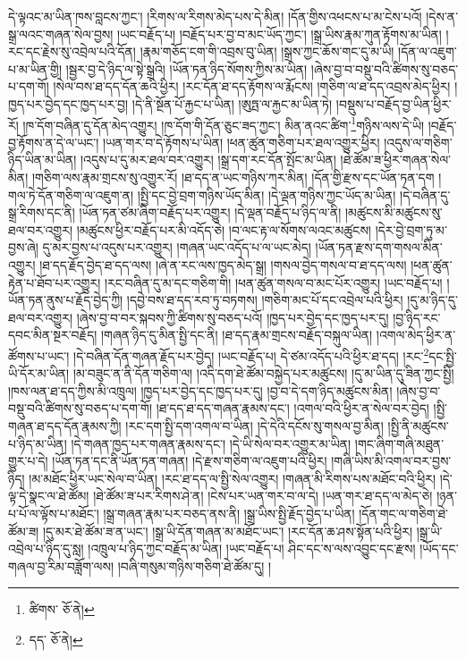 དེ་ལྟའང་མ་ཡིན་ཁས་བླངས་ཀྱང་། །རིགས་ལ་རིགས་མེད་པས་དེ་མིན། །དོན་གྱིས་འཕངས་པ་མ་ངེས་པའོ། །དེས་ན་སྒྲ་ལའང་གཞན་སེལ་བྱས། །ཡང་བརྗོད་པ། །བརྗོད་པར་བྱ་བ་མང་ཡོད་ཀྱང་། །སྒྲ་ཡིས་རྣམ་ཀུན་རྟོགས་མ་ཡིན། །རང་དང་རྗེས་སུ་འབྲེལ་པའི་དོན། །རྣམ་གཅོད་ངག་གི་འབྲས་བུ་ཡིན། །སྒྲས་ཀྱང་ཆོས་གང་དུ་མ་ཡི། །དོན་ལ་འཇུག་པ་མ་ཡིན་གྱི། །སྦྱར་བྱ་དེ་ཉིད་ལ་སྟེ་སྒྲའི། །ཡོན་ཏན་ཉིད་སོགས་ཀྱིས་མ་ཡིན། །ཞེས་བྱ་བ་བསྡུ་བའི་ཚིགས་སུ་བཅད་པ་དག་གོ། །སེལ་བས་ཐ་དད་དོན་ཆའི་ཕྱིར། །རང་དོན་ཐ་དད་རྟོགས་ལ་རྨོངས། །གཅིག་ལ་ཐ་དད་འབྲས་མེད་ཕྱིར། །ཁྱད་པར་བྱེད་དང་ཁྱད་པར་བྱ། །དེ་ནི་སྔོན་པོ་རྐྱང་པ་ཡིན། །ཨུཏྤ་ལ་རྐྱང་མ་ཡིན་ཏེ། །བསྡུས་པ་བརྗོད་བྱ་ཡིན་ཕྱིར་རོ། །ཁ་དོག་བཞིན་དུ་དོན་མེད་འགྱུར། །ཁ་དོག་གི་དོན་ཅུང་ཟད་ཀྱང་། མིན་ནའང་ཚིག་\footnote{ཚིགས་  ཅོ་ནེ། }གཉིས་ལས་དེ་ཡི། །བརྗོད་བྱ་རྟོགས་ན་དེ་ལ་ཡང་། །ཡན་གར་བ་དེ་རྟོགས་པ་ཡིན། །ཕན་ཚུན་གཅིག་པར་ཐལ་འགྱུར་ཕྱིར། །འདུས་ལ་གཅིག་ཉིད་ཡིན་མ་ཡིན། །འདུས་པ་དུ་མར་ཐལ་བར་འགྱུར། །སྒྲ་དག་རང་དོན་སྤོང་མ་ཡིན། །ཐེ་ཚོམ་ཟ་ཕྱིར་གཞན་སེལ་མིན། །གཅིག་ལས་རྣམ་གྲངས་སུ་འགྱུར་རོ། །ཐ་དད་ན་ཡང་གཉིས་ཀར་མིན། །དོན་གྱི་རྫས་དང་ཡོན་ཏན་དག །གལ་ཏེ་དོན་གཅིག་ལ་འཇུག་ན། །སྤྱི་དང་བྱེ་བྲག་གཉིས་ཡོད་མིན། །དེ་ལྡན་གཉིས་ཀྱང་ཡོད་མ་ཡིན། །དེ་བཞིན་དུ་སྒྲ་རིགས་དང་ནི། །ཡོན་ཏན་ཙམ་ཞིག་བརྗོད་པར་འགྱུར། །དེ་ལྡན་བརྗོད་པ་ཉིད་ལ་ནི། །མཚུངས་མི་མཚུངས་སུ་ཐལ་བར་འགྱུར། །མཚུངས་ཕྱིར་བརྗོད་པར་མི་འདོད་ཅེ། །བ་ལང་རྟ་ལ་སོགས་ལའང་མཚུངས། །དེར་བྱེ་བྲག་ཏུ་མ་བྱས་ཞེ། དུ་མར་བྱས་པ་འདུས་པར་འགྱུར། །གཞན་ཡང་འདོད་པ་ལ་ཡང་མེད། །ཡོན་ཏན་རྫས་དག་གསལ་མིན་འགྱུར། །ཐ་དད་རྗོད་བྱེད་ཐ་དད་ལས། །ཞེ་ན་རང་ལས་ཁྱད་མེད་སྒྲ། །གསལ་བྱེད་གསལ་བ་ཐ་དད་ལས། །ཕན་ཚུན་རྟེན་པ་ཐོབ་པར་འགྱུར། །རང་བཞིན་དུ་མ་དང་གཅིག་གི། །ཕན་ཚུན་གསལ་བ་མང་པོར་འགྱུར། །ཡང་བརྗོད་པ། །
ཡོན་ཏན་ནུས་པ་རྗོད་བྱེད་ཀྱི། །དབྱེ་བས་ཐ་དད་རབ་ཏུ་བཏགས། །གཅིག་མང་པོ་དང་འབྲེལ་པའི་ཕྱིར། །དུ་མ་ཉིད་དུ་ཐལ་བར་འགྱུར། །ཞེས་བྱ་བ་བར་སྐབས་ཀྱི་ཚིགས་སུ་བཅད་པའོ། །ཁྱད་པར་བྱེད་དང་ཁྱད་པར་དུ། །བྱ་ཉིད་རང་དབང་མིན་སྔར་བརྗོད། །གཞན་ཉིད་དུ་མིན་སྤྱི་དང་ནི། །ཐ་དད་རྣམ་གྲངས་བརྗོད་བསྐུལ་ཡིན། །འགལ་མེད་ཕྱིར་ན་ཚོགས་པ་ཡང་། །དེ་བཞིན་དོན་གཞན་རྗོད་པར་བྱེད། །ཡང་བརྗོད་པ། དེ་ཙམ་འདོད་པའི་ཕྱིར་ཐ་དད། །རང་\footnote{དད་  ཅོ་ནེ། }དང་སྤྱི་ཡི་དོར་མ་ཡིན། །མ་བཟུང་ན་ནི་དོན་གཅིག་ལ། །འདི་དག་ཐེ་ཚོམ་བསྐྱེད་པར་མཚུངས། །དུ་མ་ཡིན་དུ་ཟིན་ཀྱང་སྤྱི། །ཁས་ལན་ཐ་དད་ཀྱིས་མི་འཁྲུལ། །ཁྱད་པར་བྱེད་དང་ཁྱད་པར་དུ། །བྱ་བ་དེ་དག་ཉིད་མཚུངས་མིན། །ཞེས་བྱ་བ་བསྡུ་བའི་ཚིགས་སུ་བཅད་པ་དག་གོ། །ཐ་དད་ཐ་དད་གཞན་རྣམས་དང་། །འགལ་བའི་ཕྱིར་ན་སེལ་བར་བྱེད། །སྤྱི་གཞན་ཐ་དད་དོན་རྣམས་ཀྱི། །རང་དག་སྤྱི་དག་འགལ་བ་ཡིན། །དེ་དེའི་དངོས་སུ་གསལ་བྱ་མིན། །སྤྱི་ནི་མཚུངས་པ་ཉིད་མ་ཡིན། །དེ་གཞན་ཁྱད་པར་གཞན་རྣམས་དང་། །དེ་ཡི་སེལ་བར་འགྱུར་མ་ཡིན། །གང་ཞིག་གཞི་མཐུན་གྱུར་པ་དེ། །ཡོན་ཏན་དང་ནི་ཡོན་ཏན་གཞན། །དེ་རྫས་གཅིག་ལ་འཇུག་པའི་ཕྱིར། །གཞི་ཡིས་མི་འགལ་བར་བྱས་ཉིད། །མ་མཐོང་ཕྱིར་ཡང་སེལ་བ་ཡིན། །རང་ཐ་དད་ལ་སྤྱི་སེལ་འགྱུར། །གཞན་མི་རིགས་པས་མཐོང་བའི་ཕྱིར། །དེ་ལྟ་དེ་སྣང་ལ་ཐེ་ཚོམ། །ཐེ་ཚོམ་ཟ་པར་རིགས་ཤེ་ན། །ངེས་པར་ཡན་གར་བ་ལ་དེ། །ཡན་གར་ཐ་དད་ལ་མེད་ཅེ། །ཉན་པ་པོ་ལ་ལྟོས་པ་མཐོང་། །སྒྲ་གཞན་རྣམ་པར་བཅད་ནས་ནི། །སྒྲ་ཡིས་སྤྱི་རྗོད་བྱེད་པ་ཡིན། །དོན་གང་ལ་གཅིག་ཐེ་ཚོམ་ཟ། །དུ་མར་ཐེ་ཚོམ་ཟ་ན་ཡང་། །སྒྲ་ཡི་དོན་གཞན་མ་མཐོང་ཡང་། །རང་དོན་ཆ་ཤས་སྟོན་པའི་ཕྱིར། །སྒྲ་ཡི་འབྲེལ་པ་ཉིད་དུ་སླ། །འཁྲུལ་པ་ཉིད་ཀྱང་བརྗོད་མ་ཡིན། །ཡང་བརྗོད་པ། ཤིང་དང་ས་ལས་འབྱུང་དང་རྫས། །ཡོད་དང་གཞལ་བྱ་རིམ་བཟློག་ལས། །བཞི་གསུམ་གཉིས་གཅིག་ཐེ་ཚོམ་དུ། །

